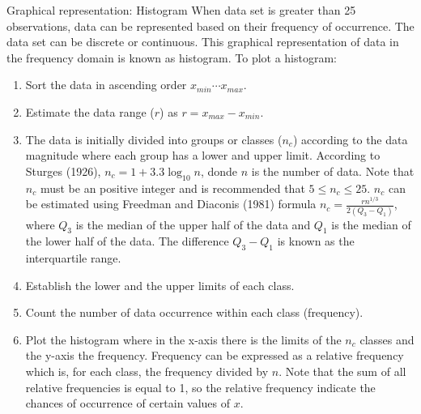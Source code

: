 \documentclass[8pt]{beamer}
\renewcommand{\emph}[1]{\textcolor{myorange}{#1}}
\begin{document}
\begin{frame}{Graphical representation: Histogram}
        When data set is greater than 25 observations, data can be represented based on their frequency of occurrence. The data set can be discrete or continuous. This graphical representation of data in the frequency domain is known as \emph{histogram}. To plot a histogram:
        \begin{enumerate}
            \item Sort the data in ascending order $x_{min}\cdots x_{max}$.
            \item Estimate the data range ($r$) as $r = x_{max} - x_{min} $.
            \item The data is initially divided  into groups or classes ($n_c$) according to the data magnitude where each group has a lower and upper limit.  According to Sturges (1926), $n_c = 1 + 3.3 \log_{10} n $, donde $n$ is the number of data. Note that $n_c$ must be an positive integer and is recommended that $5 \le n_c \le 25$. $n_c$ can be estimated using Freedman and Diaconis (1981) formula  $n_c = \frac{r n^{1/3}}{2\left(Q_3 - Q_1\right)}$, where $Q_3$ is the median of the upper half of the data and $Q_1$ is the median of the lower half of the data. The difference $Q_3 - Q_1$ is known as the \emph{interquartile range}.
            \item Establish the lower and the upper limits of each class.
            \item Count the number of data occurrence within each class (frequency).
            \item Plot the histogram where in the x-axis there is the limits of the $n_c$ classes and the y-axis the frequency. Frequency can be expressed as a \emph{relative frequency} which is, for each class, the frequency divided by $n$. Note that the sum of all relative frequencies is equal to 1, so the relative frequency indicate the chances of occurrence of certain values of $x$.
\end{enumerate}
\end{frame}
\end{document}
